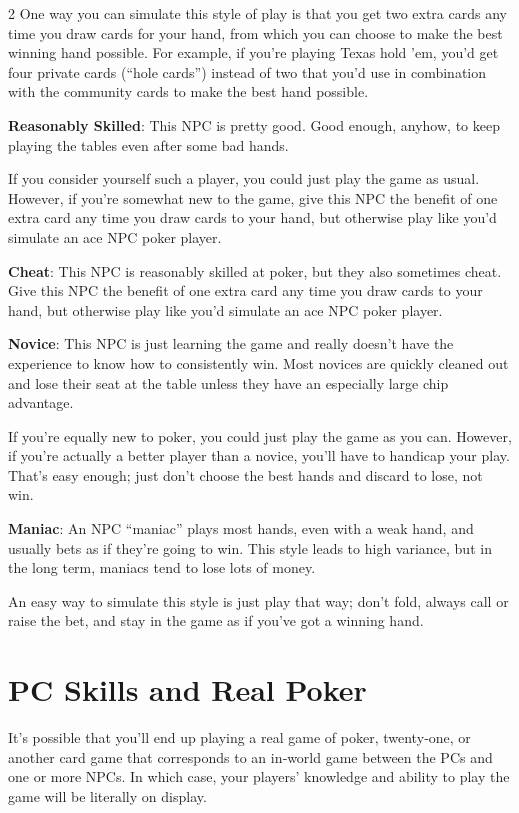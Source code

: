 \begin{multicols}{2}
One way you can simulate this style of play is that you get two extra cards any time you draw cards for your hand, from which you can choose to make the best winning hand possible. For example, if you’re playing Texas hold ’em, you’d get four private cards (“hole cards”) instead of two that you’d use in combination with the community cards to make the best hand possible.

\textbf{Reasonably Skilled}: This NPC is pretty good. Good enough, anyhow, to keep playing the tables even after some bad hands. 

If you consider yourself such a player, you could just play the game as usual. However, if you’re somewhat new to the game, give this NPC the benefit of one extra card any time you draw cards to your hand, but otherwise play like you’d simulate an ace NPC poker player. 

\textbf{Cheat}: This NPC is reasonably skilled at poker, but they also sometimes cheat. Give this NPC the benefit of one extra card any time you draw cards to your hand, but otherwise play like you’d simulate an ace NPC poker player. 

\textbf{Novice}: This NPC is just learning the game and really doesn’t have the experience to know how to consistently win. Most novices are quickly cleaned out and lose their seat at the table unless they have an especially large chip advantage. 

If you’re equally new to poker, you could just play the game as you can. However, if you’re actually a better player than a novice, you’ll have to handicap your play. That’s easy enough; just don’t choose the best hands and discard to lose, not win. 

\textbf{Maniac}: An NPC “maniac” plays most hands, even with a weak hand, and usually bets as if they’re going to win. This style leads to high variance, but in the long term, maniacs tend to lose lots of money. 

An easy way to simulate this style is just play that way; don’t fold, always call or raise the bet, and stay in the game as if you’ve got a winning hand.

\section{PC Skills and Real Poker}
 
It’s possible that you’ll end up playing a real game of poker, twenty‑one, or another card game that corresponds to an in‑world game between the PCs and one or more NPCs. In which case, your players’ knowledge and ability to play the game will be literally on display. 


\end{multicols}
